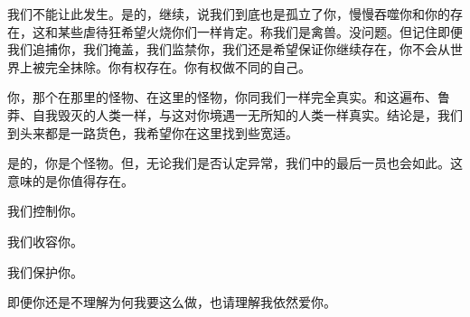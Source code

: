 我们不能让此发生。是的，继续，说我们到底也是孤立了你，慢慢吞噬你和你的存在，这和某些虐待狂希望火烧你们一样肯定。称我们是禽兽。没问题。但记住即便我们追捕你，我们掩盖，我们监禁你，我们还是希望保证你继续存在，你不会从世界上被完全抹除。你有权存在。你有权做不同的自己。

你，那个在那里的怪物、在这里的怪物，你同我们一样完全真实。和这遍布、鲁莽、自我毁灭的人类一样，与这对你境遇一无所知的人类一样真实。结论是，我们到头来都是一路货色，我希望你在这里找到些宽适。

是的，你是个怪物。但，无论我们是否认定异常，我们中的最后一员也会如此。这意味的是你值得存在。

我们控制你。

我们收容你。

我们保护你。

即便你还是不理解为何我要这么做，也请理解我依然爱你。

